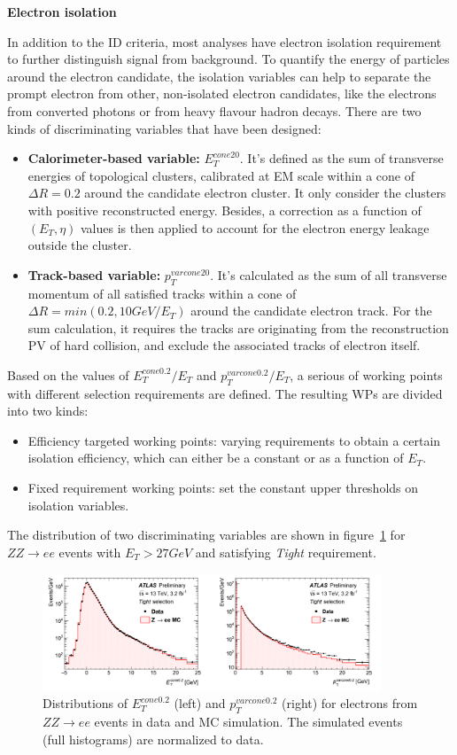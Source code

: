 \textbf{Electron isolation}

In addition to the ID criteria, most analyses have electron isolation requirement to further distinguish signal from background.
To quantify the energy of particles around the electron candidate, the isolation variables can help to separate the prompt electron from other, non-isolated electron candidates, like the electrons from converted photons or from heavy flavour hadron decays.
There are two kinds of discriminating variables that have been designed:
\begin{itemize}
	\item \textbf{Calorimeter-based variable:} $E_{T}^{cone20}$. It's defined as the sum of transverse energies of topological clusters\cite{Aad:2016upy}, calibrated at EM scale within a cone of $\Delta R = 0.2$ around the candidate electron cluster. It only consider the clusters with positive reconstructed energy. Besides, a correction as a function of $(E_{T}, \eta)$ values is then applied to account for the electron energy leakage outside the cluster.
	\item \textbf{Track-based variable:} $p_{T}^{varcone20}$. It's calculated as the sum of all transverse momentum of all satisfied tracks within a cone of $\Delta R = min(0.2, 10 GeV/E_{T})$ around the candidate electron track. For the sum calculation, it requires the tracks are originating from the reconstruction PV of hard collision, and exclude the associated tracks of electron itself.
\end{itemize}
Based on the values of $E_{T}^{cone0.2}/E_{T}$ and $p_{T}^{varcone0.2}/E_{T}$, a serious of working points with different selection requirements are defined.
The resulting WPs are divided into two kinds:
\begin{itemize}
	\item Efficiency targeted working points: varying requirements to obtain a certain isolation efficiency, which can either be a constant or as a function of $E_{T}$.
	\item Fixed requirement working points: set the constant upper thresholds on isolation variables.
\end{itemize}
The distribution of two discriminating variables are shown in figure~\ref{fig:ele_iso} for $ZZ \rightarrow ee$ events with $E_{T} > 27 GeV$ and satisfying \textit{Tight} requirement.
\begin{figure}[!htb]
  \centering
  \includegraphics[width=0.9\textwidth]{figures/Simulation/ele_iso.png}
  \caption{Distributions of $E_{T}^{cone0.2}$ (left) and $p_{T}^{varcone0.2}$ (right) for electrons from $ZZ \rightarrow ee$ events in data and MC simulation. The simulated events (full histograms) are normalized to data.}
  \label{fig:ele_iso}
\end{figure}

